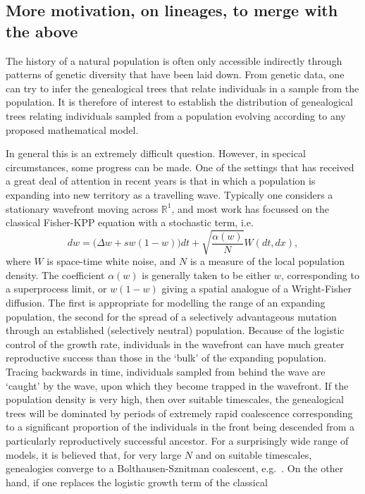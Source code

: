 \documentclass[12pt]{article}
\newcommand{\IR}{\mathbb R}
\begin{document}
\subsection{More motivation, on lineages, to merge with the above}

The history of a natural population is often only accessible indirectly 
through patterns of genetic diversity that have been laid down. From 
genetic data, one can try to infer the genealogical trees that relate 
individuals in a sample from the population. It is therefore of interest
to establish the distribution of genealogical trees relating individuals
sampled from a population evolving according to any proposed mathematical
model.

In general this is an extremely difficult question. However, in specical
circumstances, some progress can be made. One of the settings that
has received a great deal of attention in recent years is that in which 
a population is expanding into new territory as a travelling wave. 
Typically one considers a stationary wavefront moving across $\IR^1$, and
most work has focussed on the classical Fisher-KPP equation with a 
stochastic term, i.e.
$$dw=\big(\Delta w +sw(1-w)\Big)dt +\sqrt{\frac{\alpha(w)}{N}}W(dt,dx),$$
where $W$ is space-time white noise, and $N$ is a measure of the 
local population density. The coefficient
$\alpha(w)$ is generally taken to be either
$w$, corresponding to a superprocess limit, or $w(1-w)$ giving a 
spatial analogue of a Wright-Fisher diffusion. The first is 
appropriate for modelling the range of an expanding population,
the second for the spread of a selectively advantageous 
mutation through an established (selectively neutral) population. 
Because of the logistic control of the growth rate,
individuals in the wavefront can have much greater reproductive success
than those in the `bulk' of the expanding population. 
Tracing backwards in time, individuals sampled
from behind the wave are `caught' by the wave, upon which they become
trapped in the wavefront. If the population density is very high, then over
suitable timescales, the genealogical trees will be dominated by 
periods of extremely rapid coalescence corresponding to a significant 
proportion of the individuals in the front being descended from a particularly
reproductively successful ancestor. For a surprisingly wide range of models, 
it is believed that, for very large $N$ and on suitable timescales, 
genealogies converge to a 
Bolthausen-Sznitman coalescent, e.g.~\cite{brunet/derrida/mueller/munier:2007}. 
On the other hand, if one replaces the logistic growth term of the classical
\end{document}
